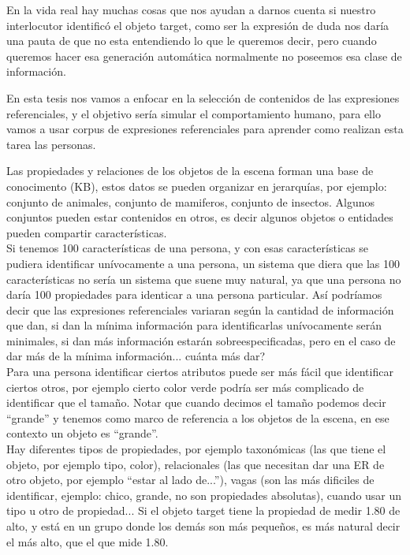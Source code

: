 En la vida real hay muchas cosas que nos ayudan a darnos cuenta si nuestro interlocutor identific\'o el objeto target, como ser la expresi\'on de duda nos dar\'ia una pauta de que no esta entendiendo lo que le queremos decir, pero cuando queremos hacer esa generaci\'on autom\'atica normalmente no poseemos esa clase de informaci\'on.

En esta tesis nos vamos a enfocar en la selecci\'on de contenidos de las expresiones referenciales, y el objetivo ser\'ia simular el comportamiento humano, para ello vamos a usar corpus de expresiones referenciales para aprender como realizan esta tarea las personas.
 
Las propiedades y relaciones de los objetos de la escena forman una base de conocimento (KB), estos datos se pueden organizar en jerarqu\'ias, por ejemplo: conjunto de animales, conjunto de mamiferos, conjunto de insectos. Algunos conjuntos pueden estar contenidos en otros, es decir algunos objetos o entidades pueden compartir caracter\'isticas.\\

Si tenemos 100 caracter\'isticas de una persona, y con esas caracter\'isticas se pudiera identificar un\'ivocamente a una persona, un sistema que diera que las 100 caracter\'isticas no ser\'ia un sistema que suene muy natural, ya que una persona no dar\'ia 100 propiedades para identicar a una persona particular. As\'i podr\'iamos decir que las expresiones referenciales variaran seg\'un la cantidad de informaci\'on que dan, si dan la m\'inima informaci\'on para identificarlas un\'ivocamente ser\'an minimales, si dan m\'as informaci\'on estar\'an sobreespecificadas, pero en el caso de dar m\'as de la m\'inima informaci\'on... cu\'anta m\'as dar?\\


Para una persona identificar ciertos atributos puede ser m\'as f\'acil que identificar ciertos otros, por ejemplo cierto color verde podr\'{i}a ser m\'as complicado de identificar que el tama\~no. Notar que cuando decimos el tama\~no podemos decir ``grande'' y tenemos como marco de referencia a los objetos de la escena, en ese contexto un objeto es ``grande''.\\

Hay diferentes tipos de propiedades, por ejemplo taxon\'omicas (las que tiene el objeto, por ejemplo tipo, color), relacionales (las que necesitan dar una ER de otro objeto, por ejemplo ``estar al lado de...''), vagas (son las m\'as dificiles de identificar, ejemplo: chico, grande, no son propiedades absolutas), cuando usar un tipo u otro de propiedad... 
Si el objeto target tiene la propiedad de medir 1.80 de alto, y est\'a en un grupo donde los dem\'as son m\'as peque\~nos, es m\'as natural decir el m\'as alto, que el que mide 1.80.\\

